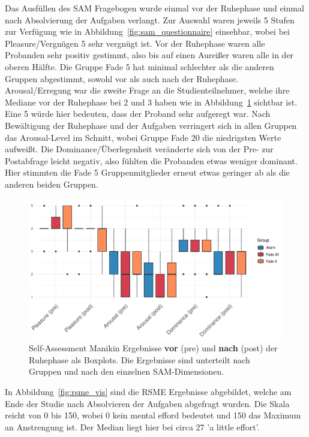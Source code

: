 Das Ausfüllen des SAM Fragebogen wurde einmal vor der Ruhephase und einmal nach Absolvierung der Aufgaben verlangt. Zur Auswahl waren jeweils 5 Stufen zur Verfügung wie in Abbildung~\ref{fig:sam_questionnaire} einsehbar, wobei bei Pleasure/Vergnügen 5 sehr vergnügt ist. Vor der Ruhephase waren alle Probanden sehr positiv gestimmt, also bis auf einen Aureißer waren alle in der oberen Hälfte. Die Gruppe Fade 5 hat minimal schlechter als die anderen Gruppen abgestimmt, sowohl vor als auch nach der Ruhephase. Arousal/Erregung war die zweite Frage an die Studienteilnehmer, welche ihre Mediane vor der Ruhephase bei 2 und 3 haben wie in Abbildung~\ref{fig:samResults} sichtbar ist. Eine 5 würde hier bedeuten, dass der Proband sehr aufgeregt war. Nach Bewältigung der Ruhephase und der Aufgaben verringert sich in allen Gruppen das Arousal-Level im Schnitt, wobei Gruppe Fade 20 die niedrigsten Werte aufweißt. Die Dominance/Überlegenheit veränderte sich von der Pre- zur Postabfrage leicht negativ, also fühlten die Probanden etwas weniger dominant. Hier stimmten die Fade 5 Gruppenmitglieder erneut etwas geringer ab als die anderen beiden Gruppen.

\begin{figure}[H]
	\centering
	\includegraphics[width=\textwidth]{./_StudyResults/SAMresults}
	\caption{Self-Assessment Manikin Ergebnisse \textbf{vor} (pre) und \textbf{nach} (post) der Ruhephase als Boxplots. Die Ergebnisse sind unterteilt nach Gruppen und nach den einzelnen SAM-Dimensionen.}
	\label{fig:samResults}
\end{figure}

In Abbildung~\ref{fig:rsme_vis} sind die RSME Ergebnisse abgebildet, welche am Ende der Studie nach Absolvieren der Aufgaben abgefragt wurden. Die Skala reicht von 0 bis 150, wobei 0 kein mental efford bedeutet und 150 das Maximum an Anstrengung ist. Der Median liegt hier bei circa 27 'a little effort'.


